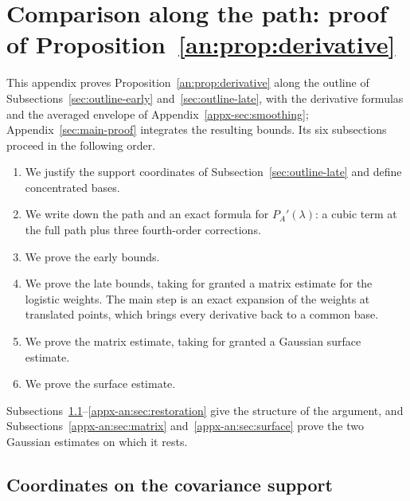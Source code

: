 \documentclass[11pt,letterpaper]{article}
\newif\ifshowrev
\newenvironment{revblock}{\ifshowrev\color{revblue}%
\hypersetup{linkcolor=revblue,citecolor=revblue,urlcolor=revblue}\fi}{}
\newif\ifshowtrim
\newcommand{\trim}[1]{\ifshowtrim{\color{revblue}%
\hypersetup{linkcolor=revblue,citecolor=revblue,urlcolor=revblue}#1}\else#1\fi}
\newcommand{\trs}[1]{\ifshowtrim{\color{revblue}#1}\else#1\fi}
\theoremstyle{remark}
\begin{document}
\begin{revblock}
\section{\texorpdfstring{\trs{Comparison along the path: proof of Proposition~\ref{an:prop:derivative}}}{Comparison along the path: proof of Proposition 1}}\label{appx-sec:support}

This appendix proves Proposition~\ref{an:prop:derivative} along the
outline of Subsections~\ref{sec:outline-early}
and~\ref{sec:outline-late}\trim{, with the derivative formulas and the
averaged envelope of Appendix~\ref{appx-sec:smoothing}; Appendix~\ref{sec:main-proof}
integrates the resulting bounds}. Its six subsections proceed in the following
order.
\begin{enumerate}
\item[\trs{\ref{appx-an:sec:coords}.}] \trim{We justify the support coordinates of
Subsection~\ref{sec:outline-late} and define concentrated bases.}
\item[\trs{\ref{appx-an:sec:path}.}] We write down the path and an exact formula for
\(P_A'(\lambda)\): a cubic term at the full path plus three
fourth-order corrections.
\item[\trs{\ref{appx-an:sec:early}.}] We prove the early bounds.
\item[\trs{\ref{appx-an:sec:restoration}.}] We prove the late bounds, taking for granted a matrix
estimate for the logistic weights. The main \trim{step} is an exact expansion
of the weights at translated points, which brings every derivative back
to a common base.
\item[\trs{\ref{appx-an:sec:matrix}.}] We prove the matrix estimate, taking for granted a Gaussian
surface estimate.
\item[\trs{\ref{appx-an:sec:surface}.}] We prove the surface estimate.
\end{enumerate}
Subsections~\trs{\ref{appx-an:sec:coords}--\ref{appx-an:sec:restoration}} give the structure of the argument, and
Subsections~\trs{\ref{appx-an:sec:matrix}} and~\trs{\ref{appx-an:sec:surface}} prove the two Gaussian estimates on which it
rests.

\subsection{Coordinates on the covariance support}
\label{appx-an:sec:coords}


\end{revblock}
\end{document}
